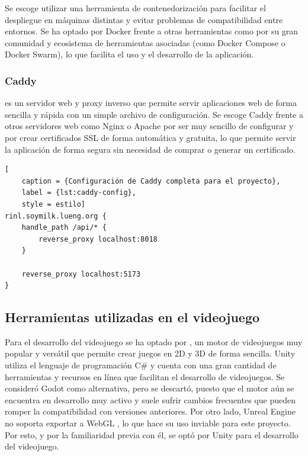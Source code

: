 Se escoge utilizar una herramienta de contenedorización para facilitar el
despliegue en máquinas distintas y evitar problemas de compatibilidad entre
entornos. Se ha optado por Docker frente a otras herramientas como
 por su gran comunidad y ecosistema de
herramientas asociadas (como Docker Compose o Docker Swarm), lo que facilita el
uso y el desarrollo de la aplicación.

\subsubsection{Caddy}
\label{c08:subsubsec:caddy}
 es un servidor web y proxy inverso que
permite servir aplicaciones web de forma sencilla y rápida con un simple archivo
de configuración. Se escoge Caddy frente a otros servidores web como Nginx o
Apache por ser muy sencillo de configurar y por crear certificados SSL de forma
automática y gratuita, lo que permite servir la aplicación de forma segura sin
necesidad de comprar o generar un certificado.

\begin{lstlisting}[
    caption = {Configuración de Caddy completa para el proyecto},
    label = {lst:caddy-config},
    style = estilo]
rinl.soymilk.lueng.org {
    handle_path /api/* {
        reverse_proxy localhost:8018
    }

    reverse_proxy localhost:5173
}
\end{lstlisting}

\subsection{Herramientas utilizadas en el videojuego}
\label{c08:subsec:herramientas-videojuego}
Para el desarrollo del videojuego se ha optado por
, un motor de videojuegos muy popular y versátil
que permite crear juegos en 2D y 3D de forma sencilla. Unity utiliza el lenguaje
de programación C\# y cuenta con una gran cantidad de herramientas y recursos en
línea que facilitan el desarrollo de videojuegos. Se consideró Godot como
alternativa, pero se descartó, puesto que el motor aún se encuentra en
desarrollo muy activo y suele sufrir cambios frecuentes que pueden romper la
compatibilidad con versiones anteriores. Por otro lado, Unreal Engine no soporta
exportar a WebGL \parencite{noWebExportUnrealReddit}
\parencite{noWebExportUnreal}, lo que hace su uso inviable para este proyecto.
Por esto, y por la familiaridad previa con él, se optó por Unity para el
desarrollo del videojuego.

